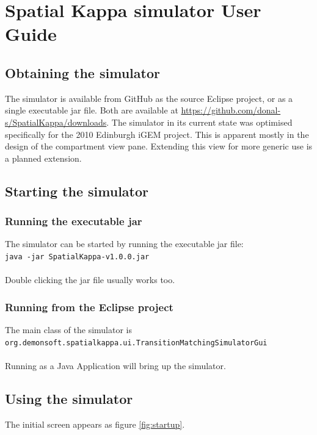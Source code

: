 \chapter{Spatial Kappa simulator User Guide}

\section{Obtaining the simulator}

The simulator is available from GitHub as the source Eclipse project, or as a single executable jar file. Both are available at \url{https://github.com/donal-s/SpatialKappa/downloads}. The simulator in its current state was optimised specifically for the 2010 Edinburgh iGEM project. This is apparent mostly in the design of the compartment view pane. Extending this view for more generic use is a planned extension.

\section{Starting the simulator}

\subsection{Running the executable jar}

The simulator can be started by running the executable jar file:\\
\verb|java -jar SpatialKappa-v1.0.0.jar|\\\\
Double clicking the jar file usually works too.

\subsection{Running from the Eclipse project}

The main class of the simulator is \\
\verb|org.demonsoft.spatialkappa.ui.TransitionMatchingSimulatorGui|\\\\
Running as a Java Application will bring up the simulator.


\section{Using the simulator}


The initial screen appears as figure \ref{fig:startup}.

